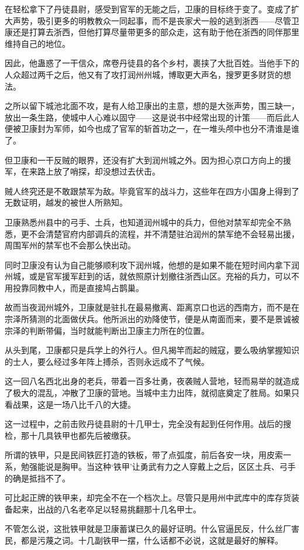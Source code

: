 在轻松拿下了丹徒县尉，感受到官军的无能之后，卫康的目标终于变了。变成了扩大声势，吸引更多的明教教众一同起事，而不是丧家犬一般的逃到浙西——尽管卫康还是打算去浙西，但他打算尽量带更多的部众走，这有助于他在浙西的同伴那里维持自己的地位。

因此，他蛊惑了一干信众，席卷丹徒县的各个乡村，裹挟了大批百姓。当他手下的人众超过两千之后，他又有了攻打润州州城，博取更大声名，搜罗更多财货的想法。

之所以留下城池北面不攻，是有人给卫康出的主意，想的是大张声势，围三缺一，放出一条生路，使城中人心难以固守——这是说书中经常出现的计策——而后此人便被卫康封为军师，如今也成了官军的斩首功之一，在一堆头颅中也分不清谁是谁了。

但卫康和一干反贼的眼界，还没有扩大到润州城之外。因为担心京口方向上的援军，在来路上放了哨探，却没想过去伏击。

贼人终究还是不敢跟禁军为敌。毕竟官军的战斗力，这些年在四方小国身上得到了无数证明，越发的被世人所熟知。

卫康熟悉州县中的弓手、土兵，也知道润州城中的兵力，但他对禁军却完全不熟悉，更不会清楚官府内部调兵的流程，并不清楚驻泊润州的禁军绝不会轻易出援，周围军州的禁军也不会那么快出动。

同时卫康没有认为自己能够顺利攻下润州城，他想的是如果不能在短时间内拿下润州城，或是官军援军赶到的话，就依照原计划撤往浙西山区。充裕的兵力，可以不用投靠同教中人，而是直接鸠占鹊巢。

故而当夜润州城外，卫康就是驻扎在最易撤离、距离京口也远的西南方，而不是在宗泽所猜测的北面做伏兵。他所派出的劝降使节，便是从南面而来，要不是景诚被宗泽的判断带偏，当时就能判断出卫康主力所在的位置。

从头到尾，卫康都只是兵学上的外行人。但凡揭竿而起的贼寇，要么吸纳掌握知识的士人，要么经过多年阵上搏杀，否则永远成不了气候。

这一回八名西北出身的老兵，带着一百多壮勇，夜袭贼人营地，轻而易举的就造成了极大的混乱，冲散了卫康的营地。当城中主力出阵，就彻底奠定了胜局。如果只看战果，这是一场八比千八的大捷。

这一过程中，之前击败丹徒县尉的十几甲士，完全没有起到任何作用。战后的搜检，那十几具铁甲也都先后被缴获。

所谓的铁甲，只是民间铁匠打造的铁板，带了点弧度，前后各安一块，用皮索一系，勉强能说是胸甲。当这种‘铁甲’让勇武有力之人穿戴上之后，区区土兵、弓手的确是抵挡不了。

可比起正牌的铁甲来，却完全不在一个档次上。尽管只是用州中武库中的库存货装备起来，出战的八名老卒足以轻易挑翻那十几名甲士。

不管怎么说，这批铁甲就是卫康蓄谋已久的最好证明。什么官逼民反，什么丝厂害民，都是污蔑之词。十几副铁甲一摆，什么话都不必说，这就是最好的解释。

